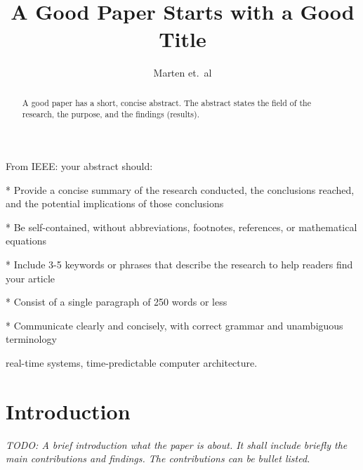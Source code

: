 \documentclass[a4paper, conference]{IEEEtran}
\newcommand{\todo}[1]{{\emph{TODO: #1}}}
\begin{document}

\title{A Good Paper Starts with a Good Title}

\author{Marten et.~al}




\maketitle \thispagestyle{empty}

\begin{abstract}
A good paper has a short, concise abstract. The abstract
states the field of the research, the purpose, and the findings (results).
\end{abstract}

From IEEE: your abstract should:

* Provide a concise summary of the research conducted, the conclusions reached, and the potential implications of those conclusions

* Be self-contained, without abbreviations, footnotes, references, or mathematical equations

* Include 3-5 keywords or phrases that describe the research to help readers find your article

* Consist of a single paragraph of 250 words or less

* Communicate clearly and concisely, with correct grammar and unambiguous terminology

\begin{IEEEkeywords}
real-time systems, time-predictable computer architecture.
\end{IEEEkeywords}



\section{Introduction}
\label{sec:intro}

\todo{A brief introduction what the paper is about. It shall include briefly the
main contributions and findings. The contributions can be bullet listed.}
\end{document}
